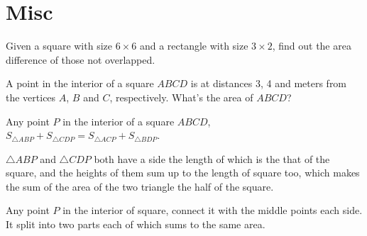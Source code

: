 \section{Misc}
\label{sec:misc}

\begin{example}
  Given a square with size $6\times6$ and a rectangle with size $3\times2$, find out the area difference of those not overlapped.

  \centering
\end{example}


\begin{example}
  A point in the interior of a square $ABCD$ is at distances 3, 4 and meters from the vertices $A$, $B$ and $C$, respectively. What's the area of $ABCD$?
\end{example}


\begin{example}
  Any point $P$ in the interior of a square $ABCD$, $S_{\triangle ABP} + S_{\triangle CDP}
  = S_{\triangle ACP} + S_{\triangle BDP}$.

  $\triangle ABP$ and $\triangle CDP$ both have a side the length of which is the that of the square, and the heights of them sum up to the length of square too, which makes the sum of the area of the two triangle the half of the square.
  

  Any point $P$ in the interior of square, connect it with the middle points each side. It split into two parts each of which sums to the same area.

  \begin{center}
  \end{center}
\end{example}

